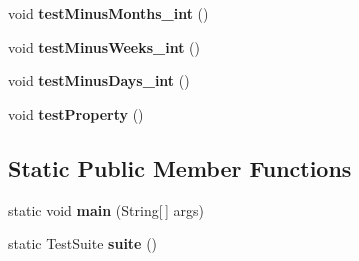 \begin{DoxyCompactItemize}
\item 
\hypertarget{classorg_1_1joda_1_1time_1_1_test_date_midnight___basics_a4df41b0668bafa219168a11882ec00d7}{void {\bfseries test\-Minus\-Months\-\_\-int} ()}\label{classorg_1_1joda_1_1time_1_1_test_date_midnight___basics_a4df41b0668bafa219168a11882ec00d7}

\item 
\hypertarget{classorg_1_1joda_1_1time_1_1_test_date_midnight___basics_ab6b27d49cf4aac236752401075366394}{void {\bfseries test\-Minus\-Weeks\-\_\-int} ()}\label{classorg_1_1joda_1_1time_1_1_test_date_midnight___basics_ab6b27d49cf4aac236752401075366394}

\item 
\hypertarget{classorg_1_1joda_1_1time_1_1_test_date_midnight___basics_af1cfcd2a88304014edb6c6c8b20d0b8c}{void {\bfseries test\-Minus\-Days\-\_\-int} ()}\label{classorg_1_1joda_1_1time_1_1_test_date_midnight___basics_af1cfcd2a88304014edb6c6c8b20d0b8c}

\item 
\hypertarget{classorg_1_1joda_1_1time_1_1_test_date_midnight___basics_a221ab9601903a9601b17e10a26c7e137}{void {\bfseries test\-Property} ()}\label{classorg_1_1joda_1_1time_1_1_test_date_midnight___basics_a221ab9601903a9601b17e10a26c7e137}

\end{DoxyCompactItemize}
\subsection*{Static Public Member Functions}
\begin{DoxyCompactItemize}
\item 
\hypertarget{classorg_1_1joda_1_1time_1_1_test_date_midnight___basics_acd76492ead41a26994027ec06970b9c8}{static void {\bfseries main} (String\mbox{[}$\,$\mbox{]} args)}\label{classorg_1_1joda_1_1time_1_1_test_date_midnight___basics_acd76492ead41a26994027ec06970b9c8}

\item 
\hypertarget{classorg_1_1joda_1_1time_1_1_test_date_midnight___basics_a2dcb0aaaf6d97244609c153d85516a3a}{static Test\-Suite {\bfseries suite} ()}\label{classorg_1_1joda_1_1time_1_1_test_date_midnight___basics_a2dcb0aaaf6d97244609c153d85516a3a}

\end{DoxyCompactItemize}
